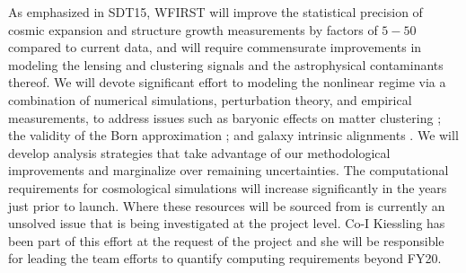  As emphasized in SDT15, WFIRST will improve the statistical precision
of cosmic expansion and structure growth measurements by factors of $5-50$
compared to current data, and will require commensurate improvements in modeling the
lensing and clustering signals  and the astrophysical contaminants thereof.
We will  devote significant effort to modeling the nonlinear regime via a combination of numerical
simulations, perturbation theory, and empirical measurements, to
 address issues such as baryonic effects on matter clustering
\citep{Zentner2013,VanDaalen2014}; the
validity of the Born approximation \citep{Schafer2012}; and galaxy intrinsic
alignments \citep{Hirata2004,Laszlo2011,Krause2015}.
We will develop analysis strategies that take advantage of
our methodological improvements and marginalize over remaining uncertainties.
The computational requirements for cosmological simulations will increase
significantly in the years just prior to launch. Where these resources will
be sourced from is currently an unsolved issue that is being investigated at
the project level. Co-I Kiessling has been part of this effort at the request of
the project and she will be responsible for leading
the team efforts to quantify computing requirements beyond FY20.
%

